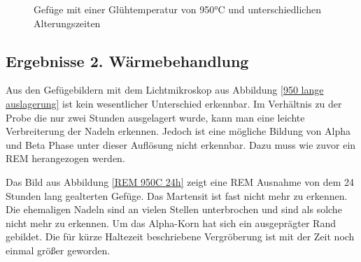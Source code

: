 \documentclass[a4paper, 11pt]{tubsreprt}
\begin{document}
\begin{figure} %
    \caption{Gefüge mit einer Glühtemperatur von 950°C und unterschiedlichen Alterungszeiten}
    \label{Glühung950+alterung}
\end{figure}
\subsection{Ergebnisse 2. Wärmebehandlung}
Aus den Gefügebildern mit dem Lichtmikroskop aus Abbildung \ref{950 lange auslagerung} ist kein wesentlicher Unterschied erkennbar. Im Verhältnis zu der Probe die nur zwei Stunden ausgelagert wurde, kann man eine leichte Verbreiterung der Nadeln erkennen. Jedoch ist eine mögliche Bildung von Alpha und Beta Phase unter dieser Auflösung nicht erkennbar. Dazu muss wie zuvor ein REM herangezogen werden.

Das Bild aus Abbildung \ref{REM 950C 24h} zeigt eine REM Ausnahme von dem 24 Stunden lang gealterten Gefüge. Das Martensit ist fast nicht mehr zu erkennen. Die ehemaligen Nadeln sind an vielen Stellen unterbrochen und sind als solche nicht mehr zu erkennen. Um das Alpha-Korn hat sich ein ausgeprägter Rand gebildet. Die für kürze Haltezeit beschriebene Vergröberung ist mit der Zeit noch einmal größer geworden.
\end{document}

